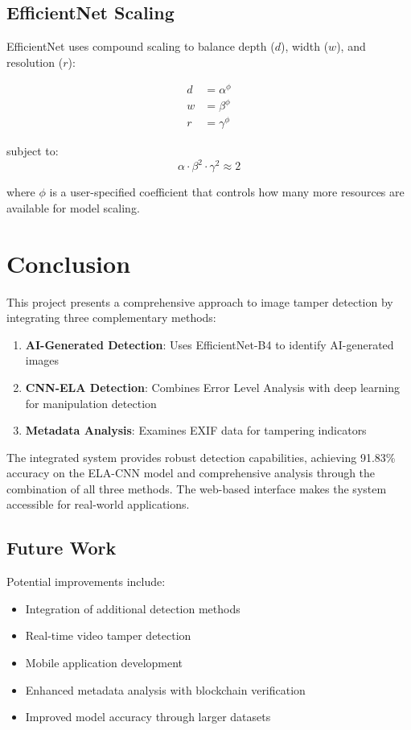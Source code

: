 \documentclass[12pt,a4paper]{article}
\begin{document}
\subsection{EfficientNet Scaling}
EfficientNet uses compound scaling to balance depth ($d$), width ($w$), and resolution ($r$):

\begin{align}
d &= \alpha^{\phi} \\
w &= \beta^{\phi} \\
r &= \gamma^{\phi}
\end{align}

subject to:
\begin{equation}
\alpha \cdot \beta^2 \cdot \gamma^2 \approx 2
\end{equation}

where $\phi$ is a user-specified coefficient that controls how many more resources are available for model scaling.

\section{Conclusion}

This project presents a comprehensive approach to image tamper detection by integrating three complementary methods:

\begin{enumerate}
    \item \textbf{AI-Generated Detection}: Uses EfficientNet-B4 to identify AI-generated images
    \item \textbf{CNN-ELA Detection}: Combines Error Level Analysis with deep learning for manipulation detection
    \item \textbf{Metadata Analysis}: Examines EXIF data for tampering indicators
\end{enumerate}

The integrated system provides robust detection capabilities, achieving 91.83\% accuracy on the ELA-CNN model and comprehensive analysis through the combination of all three methods. The web-based interface makes the system accessible for real-world applications.

\subsection{Future Work}
Potential improvements include:
\begin{itemize}
    \item Integration of additional detection methods
    \item Real-time video tamper detection
    \item Mobile application development
    \item Enhanced metadata analysis with blockchain verification
    \item Improved model accuracy through larger datasets
\end{itemize}
\end{document}
